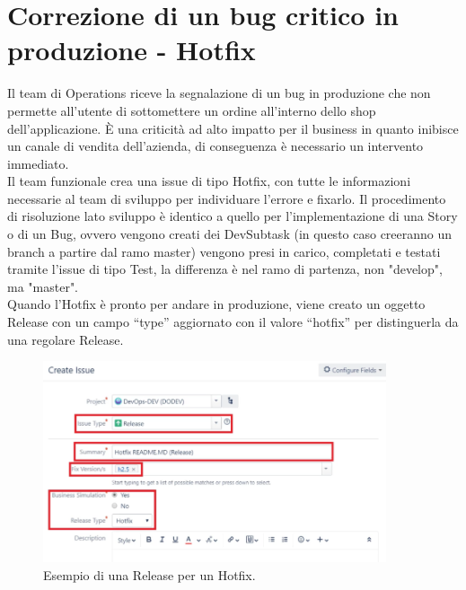 \documentclass[a4paper, 12pt]{report}
\numberwithin{equation}{section}
\begin{document}
\section{Correzione di un bug critico in produzione - Hotfix}
Il team di Operations riceve la segnalazione di un bug in produzione che non permette all’utente di sottomettere un ordine all’interno dello shop dell’applicazione. È una criticità ad alto impatto per il business in quanto inibisce un canale di vendita dell’azienda, di conseguenza è necessario un intervento immediato.\\
Il team funzionale crea una issue di tipo Hotfix, con tutte le informazioni necessarie al team di sviluppo per individuare l’errore e fixarlo. Il procedimento di risoluzione lato sviluppo è identico a quello per l’implementazione di una Story o di un Bug, ovvero vengono creati dei DevSubtask (in questo caso creeranno un branch a partire dal ramo master) vengono presi in carico, completati e testati tramite l’issue di tipo Test, la differenza è nel ramo di partenza, non "develop", ma "master".\\ Quando l’Hotfix è pronto per andare in produzione, viene creato un oggetto Release con un campo “type” aggiornato con il valore “hotfix” per distinguerla da una regolare Release. 
\begin{figure}
    \centering
    \includegraphics[width=0.9\textwidth]{imgs/hotfix.PNG}
    \caption{Esempio di una Release per un Hotfix.}
    \label{fig:hotfix-release}
\end{figure}
\end{document}
